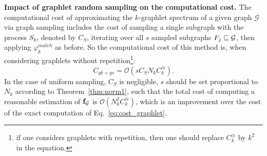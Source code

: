 \noindent\textbf{Impact of graphlet random sampling on the computational cost. }
The computational cost of approximating the $k$-graphlet spectrum of a given graph $\mathcal{G}$ via graph sampling includes the cost of sampling a single subgraph with the process $S_k$, denoted by $C_S$, iterating over all $s$ sampled subgraphs $F_j\sqsubseteq \mathcal{G}$, then applying $\varphi^{match}_k$ as before. So the computational cost of this method is, when considering graphlets without repetition\footnote{if one considers graphlets with repetition, then one should replace $C^{\cong}_k$ by $k^2$ in the equation.}:
\begin{equation}
\label{eq:cost_graphlet_sampling}
C_{gk + gs}= \mathcal{O}\left(s C_S N_k C^{\cong}_k\right).
\end{equation}
In the case of uniform sampling, $C_S$ is negligible, $s$ should be set proportional to $N_k$ according to Theorem~\ref{thm:norm1}, such that the total cost of computing a reasonable estimation of $\mathbf{f}_{\mathcal{G}}$ is $\mathcal{O}\left(N_k^2 C^{\cong}_k\right)$, which is an improvement over the cost of the exact computation of Eq.~\eqref{eq:cost_graphlet}. 


